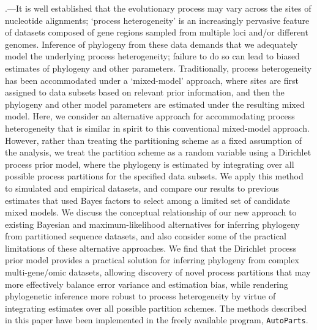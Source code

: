 \documentclass[11pt]{article}
\begin{document}
.---It is well established that the evolutionary process may vary across the sites of nucleotide alignments; `process heterogeneity' is an increasingly pervasive feature of datasets composed of gene regions sampled from multiple loci and/or different genomes.
Inference of phylogeny from these data demands that we adequately model the underlying process heterogeneity; failure to do so can lead to biased estimates of phylogeny and other parameters.
Traditionally, process heterogeneity has been accommodated under a `mixed-model' approach, where sites are first assigned to data subsets based on relevant prior information, %
and then the phylogeny and other model parameters are estimated under the resulting mixed model.
Here, we consider an alternative approach for accommodating process heterogeneity that is similar in spirit to this conventional mixed-model approach.
However, rather than treating the partitioning scheme as a fixed assumption of the analysis, we treat the partition scheme as a random variable using a Dirichlet process prior model, where the phylogeny is estimated by integrating over all possible process partitions for the specified data subsets.
We apply this method to simulated and empirical datasets, and compare our results to previous estimates that used Bayes factors to select among a limited set of candidate mixed models.
We discuss the conceptual relationship of our new approach to existing Bayesian and maximum-likelihood alternatives for inferring phylogeny from partitioned sequence datasets, and also consider some of the practical limitations of these alternative approaches. 
We find that the Dirichlet process prior model provides a practical solution for inferring phylogeny from complex multi-gene/omic datasets, allowing discovery of novel process partitions that may more effectively balance error variance and estimation bias, while rendering phylogenetic inference more robust to process heterogeneity by virtue of integrating estimates over all possible partition schemes.
The methods described in this paper have been implemented in the freely available program, \verb!AutoParts!.

\medskip
{}
\end{document}
